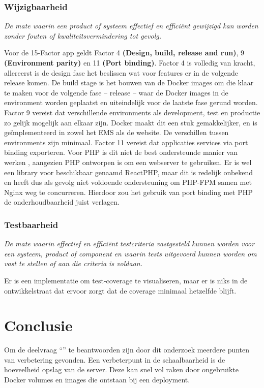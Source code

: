\subsubsection{Wijzigbaarheid}
\textit{De mate waarin een product of systeem effectief en efficiënt gewijzigd kan worden zonder fouten of kwaliteitsvermindering tot gevolg.}

Voor de 15-Factor app geldt Factor 4 \textbf{(Design, build, release and run)}, 9 \textbf{(Environment parity)} en 11 \textbf{(Port binding)}. Factor 4 is volledig van kracht, allereerst is de design fase het beslissen wat voor features er in de volgende release komen. De build stage is het bouwen van de Docker images om die klaar te maken voor de volgende fase -- release -- waar de Docker images in de environment worden geplaatst en uiteindelijk voor de laatste fase gerund worden. Factor 9 vereist dat verschillende environments als development, test en productie zo gelijk mogelijk aan elkaar zijn. Docker maakt dit een stuk gemakkelijker, en is geïmplementeerd in zowel het EMS als de website. De verschillen tussen environments zijn minimaal. Factor 11 vereist dat applicaties services via port binding exporteren. Voor PHP is dit niet de best ondersteunde manier van werken \parencite{PortBinding1, PortBinding2, PortBinding3}, aangezien PHP ontworpen is om een webserver te gebruiken. Er is wel een library voor beschikbaar genaamd ReactPHP, maar dit is redelijk onbekend en heeft dus als gevolg niet voldoende ondersteuning om PHP-FPM samen met Nginx weg te concurreren. Hierdoor zou het gebruik van port binding met PHP de onderhoudbaarheid juist verlagen.

\subsubsection{Testbaarheid}
\textit{De mate waarin effectief en efficiënt testcriteria vastgesteld kunnen worden voor een systeem, product of component en waarin tests uitgevoerd kunnen worden om vast te stellen of aan die criteria is voldaan.}

Er is een implementatie om test-coverage te visualiseren, maar er is niks in de ontwikkelstraat dat ervoor zorgt dat de coverage minimaal hetzelfde blijft. 

\section{Conclusie}
Om de deelvraag \enquote{\deelhuidig} te beantwoorden zijn door dit onderzoek meerdere punten van verbetering gevonden. Een verbeterpunt in de schaalbaarheid is de hoeveelheid opslag van de server. Deze kan snel vol raken door ongebruikte Docker volumes en images die ontstaan bij een deployment. 


